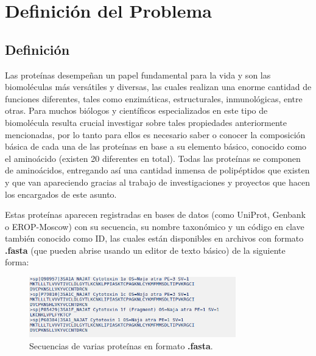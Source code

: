 \chapter{Definición del Problema}

\section{Definición}

Las proteínas desempeñan un papel fundamental para la vida y son las biomoléculas más versátiles y diversas, las cuales realizan una enorme cantidad de funciones diferentes, tales como enzimáticas, estructurales, inmunológicas, entre otras. Para muchos biólogos y científicos especializados en este tipo de biomolécula resulta crucial investigar sobre tales propiedades anteriormente mencionadas, por lo tanto para ellos es necesario saber o conocer la composición básica de cada una de las proteínas en base a su elemento básico, conocido como el aminoácido (existen 20 diferentes en total). Todas las proteínas se componen de aminoácidos, entregando así una cantidad inmensa de polipéptidos que existen y que van apareciendo gracias al trabajo de investigaciones y proyectos que hacen los encargados de este asunto.

Estas proteínas aparecen registradas en bases de datos (como UniProt, Genbank o EROP-Moscow) con su secuencia, su nombre taxonómico y un código en clave también conocido como ID, las cuales están disponibles en archivos con formato \textbf{.fasta} \cite{fasta} (que pueden abrise usando un editor de texto básico) de la siguiente forma:

\begin{figure}[ht]
    \centering
    \includegraphics[width=0.8\textwidth]{./images/secuencias.png}
    \caption{Secuencias de varias proteínas en formato \textbf{.fasta}.}
    \label{fig:image4}
\end{figure}


